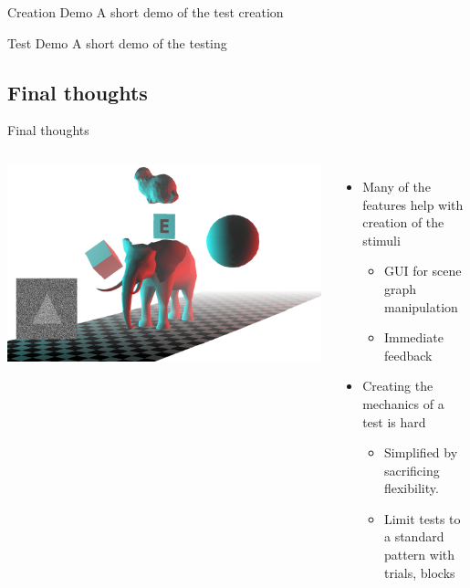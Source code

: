 \documentclass[12pt,ucs,hyperref={pdftext}]{beamer}
\newlength{\columnleft}
\newlength{\columnright}
\begin{document}
\begin{frame}{Creation Demo}
A short demo of the test creation
\end{frame}

\begin{frame}{Test Demo}
A short demo of the testing
\end{frame}


\subsection{Final thoughts}

\begin{frame}{Final thoughts}
\begin{columns}

\column{\columnleft}
\includegraphics[width=\columnleft]{media/title.png}

\column{\columnright}
\begin{itemize}%
\item Many of the features help with creation of the stimuli
\begin{itemize}
\item GUI for scene graph manipulation
\item Immediate feedback
\end{itemize}
\item Creating the mechanics of a test is hard
\begin{itemize}
\item Simplified by sacrificing flexibility.
\item Limit tests to a standard pattern with trials, blocks
\end{itemize}
\end{itemize}

\end{columns}
\end{frame}
\end{document}
